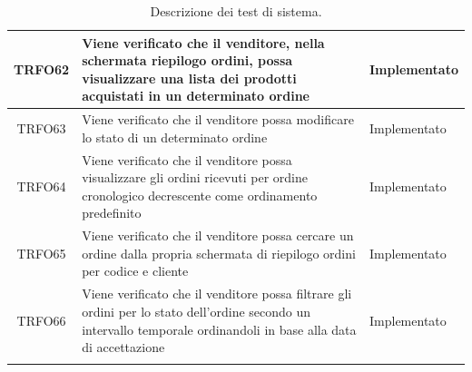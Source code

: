 \begin{longtable}{|c| C{10cm} |C{3cm}|}
    	TRFO62 & Viene verificato che il venditore, nella schermata riepilogo ordini,  possa visualizzare una lista dei prodotti acquistati in un determinato ordine & Implementato\\ \hline
    	TRFO63 & Viene verificato che il venditore possa modificare lo stato di un determinato ordine & Implementato\\ \hline
	TRFO64 & Viene verificato che il venditore possa visualizzare gli ordini ricevuti per ordine cronologico decrescente come ordinamento predefinito & Implementato\\ \hline
	TRFO65 & Viene verificato che il venditore possa cercare un ordine dalla propria schermata di riepilogo ordini per codice e cliente & Implementato\\ \hline
    	TRFO66 & Viene verificato che il venditore possa filtrare gli ordini per lo stato dell'ordine secondo un intervallo temporale ordinandoli in base alla data di accettazione & Implementato\\ \hline
    	\caption{Descrizione dei test di sistema.}
\end{longtable}
